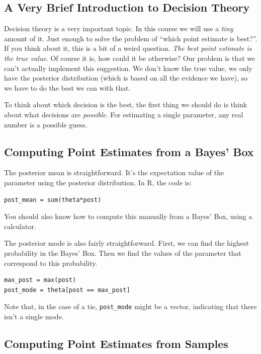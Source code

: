 \subsection{A Very Brief Introduction to Decision Theory}
Decision theory is a very important topic. In this course we will use a
{\it tiny} amount of it. Just enough to solve the problem of ``which point
estimate is best?''. If you think about it, this is a bit of a weird question.
{\it The best point estimate is the true value}. Of course it is, how could it
be otherwise? Our problem is that we can't actually implement this suggestion.
We don't know the true value, we only have the posterior distribution
(which is based on all the evidence we have), so we have to do 
the best we can with that.

To think about which decision is the best, the first thing we should do is think
about what decisions are {\it possible}. For estimating a single parameter, any
real number is a possible guess.






\subsection{Computing Point Estimates from a Bayes' Box}
The posterior mean is straightforward. It's the expectation value of the parameter
using the posterior distribution. In R, the code is:
\begin{framed}
\begin{verbatim}
post_mean = sum(theta*post)
\end{verbatim}
\end{framed}
You should also know how to compute this manually from a Bayes' Box, using a
calculator.

The posterior mode is also fairly straightforward. First, we can find the
highest probability in the Bayes' Box. Then we find the values of the parameter
that correspond to this probability.
\begin{framed}
\begin{verbatim}
max_post = max(post)
post_mode = theta[post == max_post]
\end{verbatim}
\end{framed}
Note that, in the case of a tie, {\tt post\_mode} might be a vector, indicating
that there isn't a single mode.



\subsection{Computing Point Estimates from Samples}





